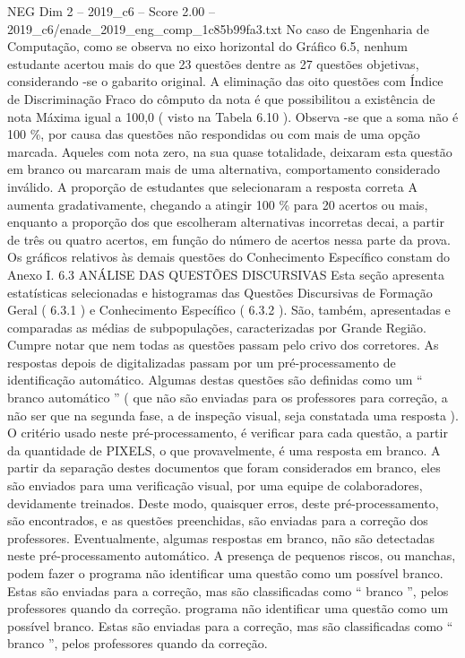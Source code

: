\begin{textsample}{NEG Dim 2 – 2019\_c6 – Score 2.00 – 2019\_c6/enade\_2019\_eng\_comp\_1c85b99fa3.txt}
No caso de Engenharia de Computação, como se observa no eixo horizontal do Gráfico 6.5, nenhum estudante acertou mais do que 23 questões dentre as 27 questões objetivas, considerando -se o gabarito original.
A eliminação das oito questões com Índice de Discriminação Fraco do cômputo da nota é que possibilitou a existência de nota Máxima igual a 100,0 ( visto na Tabela 6.10 ).
Observa -se que a soma não é 100 \%, por causa das questões não respondidas ou com mais de uma opção marcada.
Aqueles com nota zero, na sua quase totalidade, deixaram esta questão em branco ou marcaram mais de uma alternativa, comportamento considerado inválido.
A proporção de estudantes que selecionaram a resposta correta A aumenta gradativamente, chegando a atingir 100 \% para 20 acertos ou mais, enquanto a proporção dos que escolheram alternativas incorretas decai, a partir de três ou quatro acertos, em função do número de acertos nessa parte da prova.
Os gráficos relativos às demais questões do Conhecimento Específico constam do Anexo I. 6.3 ANÁLISE DAS QUESTÕES DISCURSIVAS Esta seção apresenta estatísticas selecionadas e histogramas das Questões Discursivas de Formação Geral ( 6.3.1 ) e Conhecimento Específico ( 6.3.2 ).
São, também, apresentadas e comparadas as médias de subpopulações, caracterizadas por Grande Região.
Cumpre notar que nem todas as questões passam pelo crivo dos corretores.
As respostas depois de digitalizadas passam por um pré-processamento de identificação automático.
Algumas destas questões são definidas como um “ branco automático ” ( que não são enviadas para os professores para correção, a não ser que na segunda fase, a de inspeção visual, seja constatada uma resposta ).
O critério usado neste pré-processamento, é verificar para cada questão, a partir da quantidade de PIXELS, o que provavelmente, é uma resposta em branco.
A partir da separação destes documentos que foram considerados em branco, eles são enviados para uma verificação visual, por uma equipe de colaboradores, devidamente treinados.
Deste modo, quaisquer erros, deste pré-processamento, são encontrados, e as questões preenchidas, são enviadas para a correção dos professores.
Eventualmente, algumas respostas em branco, não são detectadas neste pré-processamento automático.
A presença de pequenos riscos, ou manchas, podem fazer o programa não identificar uma questão como um possível branco.
Estas são enviadas para a correção, mas são classificadas como “ branco ”, pelos professores quando da correção. programa não identificar uma questão como um possível branco.
Estas são enviadas para a correção, mas são classificadas como “ branco ”, pelos professores quando da correção.

\end{textsample}
